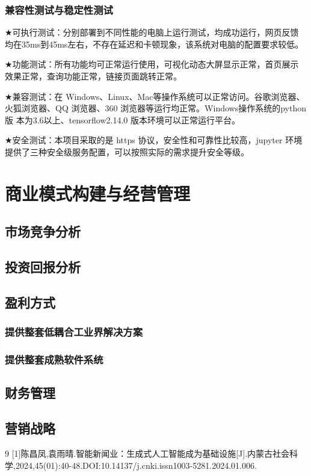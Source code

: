 \documentclass[withoutpreface,bwprint]{cumcmthesis} %
\begin{document}
	\subsubsection{ 兼容性测试与稳定性测试}
	$\bigstar$可执行测试：分别部署到不同性能的电脑上运行测试，均成功运行，网页反馈
	均在35ms到45ms左右，不存在延迟和卡顿现象，该系统对电脑的配置要求较低。\par
	$\bigstar$功能测试：所有功能均可正常运行使用，可视化动态大屏显示正常，首页展示
	效果正常，查询功能正常，链接页面跳转正常。\par
	$\bigstar$兼容测试：在 Windows、Linux、Mac等操作系统可以正常访问。谷歌浏览器、
	火狐浏览器、QQ 浏览器、360 浏览器等运行均正常。Windows操作系统的python版
	本为3.6以上、tensorflow2.14.0 版本环境可以正常运行平台。\par
	$\bigstar$安全测试：本项目采取的是 https 协议，安全性和可靠性比较高，jupyter 环境
	提供了三种安全级服务配置，可以按照实际的需求提升安全等级。\par
	\newpage
	\section{商业模式构建与经营管理}
	\subsection{市场竞争分析}
	\subsection{投资回报分析}
	\subsection{盈利方式}
	\subsubsection{ 提供整套低耦合工业界解决方案}
	\subsubsection{ 提供整套成熟软件系统}
	\subsection{财务管理}
	\subsection{营销战略}
	\newpage
	
	\begin{thebibliography}{9}%
		[1]陈昌凤,袁雨晴.智能新闻业：生成式人工智能成为基础设施[J].内蒙古社会科学,2024,45(01):40-48.DOI:10.14137/j.cnki.issn1003-5281.2024.01.006.
	\end{thebibliography}
	
	\newpage
\end{document}
